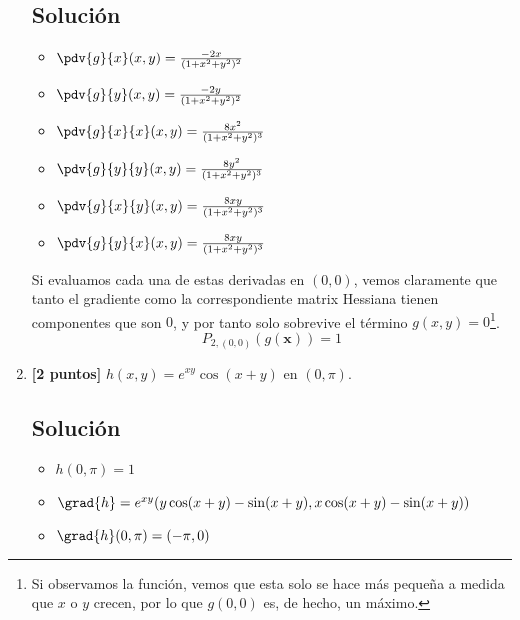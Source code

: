 \documentclass[12pt,a4paper,reqno]{article}
\begin{document}
\begin{enumerate}[label={(\alph*)}]
		\subsection*{Solución}
		\begin{itemize}
			\item $\pdv{g}{x}(x,y) = \frac{-2x}{(1+x ^{2}+y ^{2}) ^{2}}$
			\item $\pdv{g}{y}(x,y)= \frac{-2y}{(1+x ^{2}+y ^{2})^{2}}$
			\item $\pdv{g}{x}{x}(x,y)= \frac{8x ^{2}}{(1+x ^{2}+y ^{2})^{3}}$
			\item $\pdv{g}{y}{y}(x,y)= \frac{8y ^{2}}{(1+x ^{2}+y ^{2})^{3}}$
			\item $\pdv{g}{x}{y}(x,y)= \frac{8xy}{(1+x ^{2}+y ^{2})^{3}}$
			\item $\pdv{g}{y}{x}(x,y)= \frac{8xy}{(1+x ^{2}+y ^{2})^{3}}$ 
		\end{itemize}
		Si evaluamos cada una de estas derivadas en $(0,0)$, vemos claramente que tanto el gradiente como la correspondiente matrix Hessiana tienen componentes que son $0$, y por tanto solo sobrevive el término $g(x,y)=0$\footnote{Si observamos la función, vemos que esta solo se hace más pequeña a medida que $x$ o $y$ crecen, por lo que $g(0,0)$ es, de hecho, un máximo.}.   
		\[
			P_{2,(0,0)}(g(\mathbf{x}))=1
		\]
		\item \textbf{[2 puntos]} $h(x,y)=e^{xy}\cos(x+y)$ en $(0,\pi)$.
		
		\subsection*{Solución}
		\begin{itemize}
			\item $h(0, \pi)=1$
			\item $\grad{h}=e^{xy}(y\cos(x+y)-\sin(x+y),x\cos(x+y)-\sin(x+y))$
			\item $\grad{h}(0,\pi)=(-\pi,0)$ 
		\end{itemize}		

	\end{enumerate}
	
\end{document}
